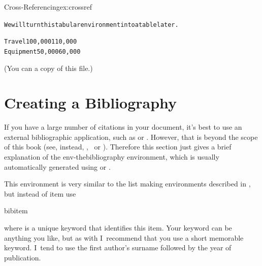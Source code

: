 \begin{exercise}{Cross-Referencing}{ex:crossref}
\begin{bcode}
\begin{alltt}
We will turn this tabular environment into a table later.

  
    
 Travel  100,000  110,000
 Equipment  50,000  60,000

\end{alltt}
\end{bcode}
(You can  a copy of this file.)

\end{exercise}


\section{Creating a Bibliography}
\label{sec:bib}

If you have a large number of citations in your document, it's best
to use an external bibliographic application, such as  or
. However, that is beyond the scope of this
book (see, instead, \latexguide, \latexcomp\
or \latexthesis). Therefore this section just gives a brief
explanation of the \gls{env-thebibliography} environment, which is
usually automatically generated using \appname{bibtex} or
.

\begin{definition}
\end{definition}
This environment is very similar to the list making environments described
in \sectionref{sec:lists}, but instead of \gls{item} use 
\begin{definition}
\gls{bibitem}
\end{definition}%
where \meta{key} is a unique keyword that identifies this
item.  Your keyword can be anything you like, but as with
 I~recommend that you use
a short memorable keyword. I~tend to use the first author's surname
followed by the year of publication. 

